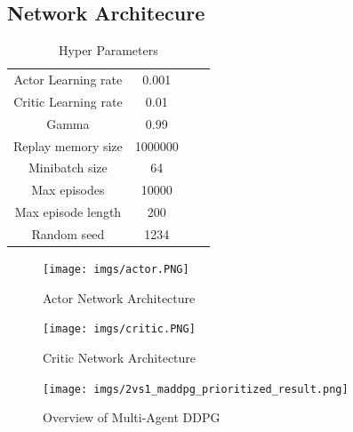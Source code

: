 \documentclass[11pt,twocolumn]{jarticle} %
\begin{document}
\subsection{Network Architecure}

\begin{table}[ht]
 \caption{Hyper Parameters} 
 \label{tbl:hyperparameters}
  \begin{center}
    \begin{tabular}{c|ccc}
  \hline \hline
  Actor Learning rate  & 0.001   \\
  Critic Learning rate & 0.01    \\
  Gamma                & 0.99    \\
  Replay memory size   & 1000000 \\
  Minibatch size       & 64      \\
  Max episodes         & 10000   \\
  Max episode length   & 200     \\
  Random seed          & 1234    \\\hline
    \end{tabular}
  \end{center}
\end{table}

\begin{figure}[h]
 \begin{center}
  \texttt{[image: imgs/actor.PNG]}
  \caption{Actor Network Architecture}\label{fig:Actor}
 \end{center}
\end{figure}

\begin{figure}[h]
 \begin{center}
  \texttt{[image: imgs/critic.PNG]}
  \caption{Critic Network Architecture}\label{fig:Critic}
 \end{center}
\end{figure}

\begin{figure}[ht]
 \begin{center}
  \texttt{[image: imgs/2vs1\_maddpg\_prioritized\_result.png]}
  \caption{Overview of Multi-Agent DDPG\cite{result1}}
  \label{fig:result1}
 \end{center}
\end{figure}
\end{document}
